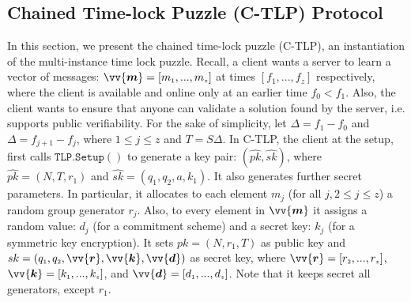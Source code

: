 \subsection{Chained  Time-lock Puzzle (C-TLP) Protocol}\label{Section::C-TLP-protocol}

In this section, we present the chained  time-lock puzzle (C-TLP), an instantiation of the multi-instance time lock puzzle. Recall, a client wants a server to learn a vector of messages: $\vv{\bm{m}}=[m_{\scriptscriptstyle 1},...,m_{\scriptscriptstyle z}]$ at times  $[f_{\scriptscriptstyle 1},...,f_{\scriptscriptstyle z}]$ respectively, where the client is available and online only at an earlier time $f_{\scriptscriptstyle 0}< f_{\scriptscriptstyle 1}$.  Also, the client wants to ensure that anyone can validate a solution found by the  server, i.e. supports public verifiability. For the sake of simplicity, let $\Delta=f_{\scriptscriptstyle 1}-f_{\scriptscriptstyle 0}$ and $\Delta=f_{\scriptscriptstyle j+1}-f_{\scriptscriptstyle j}$, where $1\leq j \leq z$ and $T=S \Delta$.  In  C-TLP, the client at the setup, first calls   $\mathtt{TLP.Setup}()$ to generate a key pair: $(\hat{pk},\hat{sk})$, where   $\hat{pk}=(N,T,r_{\scriptscriptstyle 1})$ and $\hat{sk}=(q_{\scriptscriptstyle 1},q_{\scriptscriptstyle 2},a,k_{\scriptscriptstyle 1})$. It also generates further secret parameters. In particular,  it allocates to each  element $m_{\scriptscriptstyle j}$ (for all  $j, 2\leq j\leq z$) a random group generator $r_{\scriptscriptstyle j}$. Also, to every element in $\vv{\bm{m}}$ it assigns a random value: $d_{\scriptscriptstyle j}$ (for a commitment scheme) and a  secret key: $k_{\scriptscriptstyle j}$ (for a symmetric key encryption).  It sets $pk=(N,r_{\scriptscriptstyle 1},T)$ as public key and $sk=(q_{\scriptscriptstyle 1},q_{\scriptscriptstyle 2},\vv{\bm{r}},\vv{\bm{k}},\vv{\bm{d}})$ as secret key, where $\vv{\bm{r}}=[r_{\scriptscriptstyle 2},...,r_{\scriptscriptstyle z}]$,  $\vv{\bm{k}}=[k_{\scriptscriptstyle 1},...,k_{\scriptscriptstyle z}]$, and $\vv{\bm{d}}=[d_{\scriptscriptstyle 1},...,d_{\scriptscriptstyle z}]$. Note that  it keeps secret all generators, except $r_{\scriptscriptstyle 1}$. 



